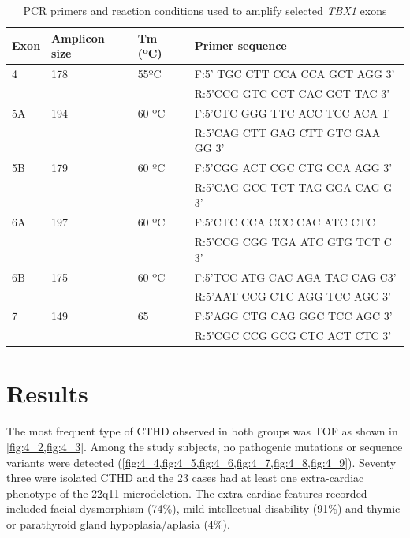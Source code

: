 \begin{refsection}
\begin{table}[!ht]
\centering
\caption[PCR primers and reaction conditions for \textit{TBX1} amplification]{PCR primers and reaction conditions used to amplify selected \textit{TBX1} exons \cite{Cabuk2007}}
\label{tab:4.1primers}
\begin{tabular}{  l  l  l  l  }
\toprule
	\textbf{Exon} & \textbf{Amplicon size} & \textbf{Tm (ºC)} & \textbf{Primer sequence} \\ \toprule
	4 & 178 & 55ºC & F:5’ TGC CTT CCA CCA GCT AGG 3’ \\ 
	 &  &  & R:5’CCG GTC CCT CAC GCT TAC 3’ \\ \midrule
	5A & 194 & 60 ºC & F:5’CTC GGG TTC ACC TCC ACA T \\ 
	 &  &  & R:5’CAG CTT GAG CTT GTC GAA GG 3’ \\ \midrule
	5B & 179 & 60 ºC & F:5’CGG ACT CGC CTG CCA AGG 3’ \\ 
	 &  &  & R:5’CAG GCC TCT TAG GGA CAG G 3’ \\ \midrule
	6A & 197 & 60 ºC & F:5’CTC CCA CCC CAC ATC CTC \\ 
	 &  &  & R:5’CCG CGG TGA ATC GTG TCT C 3’ \\ \midrule
	6B & 175 & 60 ºC & F:5’TCC ATG CAC AGA TAC CAG C3’ \\ 
	 &  &  & R:5’AAT CCG CTC AGG TCC AGC 3’ \\ \midrule
	7 & 149 & 65 & F:5’AGG CTG CAG GGC TCC AGC 3’ \\ 
	 &  &  & R:5’CGC CCG GCG CTC ACT CTC 3’ \\ \bottomrule
\end{tabular}
\end{table}

\section{Results}

The most frequent type of CTHD observed in both groups was TOF as shown in \cref{fig:4_2,fig:4_3}. Among the study subjects, no pathogenic mutations or sequence variants were detected (\cref{fig:4_4,fig:4_5,fig:4_6,fig:4_7,fig:4_8,fig:4_9}). Seventy three were isolated CTHD and the 23 cases had at least one extra-cardiac phenotype of the 22q11 microdeletion. The extra-cardiac features recorded included facial dysmorphism (74\%), mild intellectual disability (91\%) and thymic or parathyroid gland hypoplasia/aplasia (4\%). 



\end{refsection}
